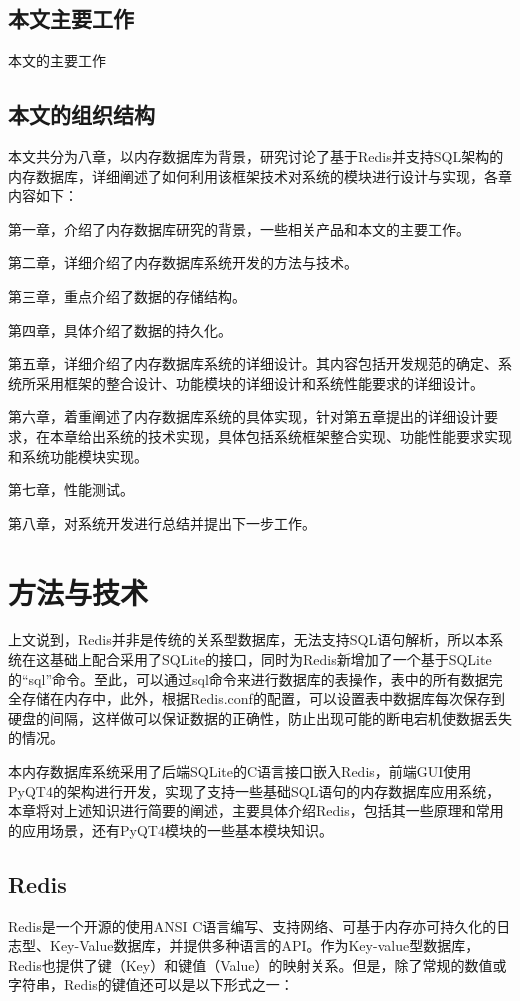 \documentclass{zjutthesis}
\begin{document}
\section{本文主要工作}
本文的主要工作

\section{本文的组织结构}
本文共分为八章，以内存数据库为背景，研究讨论了基于Redis并支持SQL架构的内存数据库，详细阐述了如何利用该框架技术对系统的模块进行设计与实现，各章内容如下：

第一章，介绍了内存数据库研究的背景，一些相关产品和本文的主要工作。

第二章，详细介绍了内存数据库系统开发的方法与技术。

第三章，重点介绍了数据的存储结构。

第四章，具体介绍了数据的持久化。

第五章，详细介绍了内存数据库系统的详细设计。其内容包括开发规范的确定、系统所采用框架的整合设计、功能模块的详细设计和系统性能要求的详细设计。

第六章，着重阐述了内存数据库系统的具体实现，针对第五章提出的详细设计要求，在本章给出系统的技术实现，具体包括系统框架整合实现、功能性能要求实现和系统功能模块实现。

第七章，性能测试。

第八章，对系统开发进行总结并提出下一步工作。


\chapter{方法与技术}
上文说到，Redis并非是传统的关系型数据库，无法支持SQL语句解析，所以本系统在这基础上配合采用了SQLite的接口，同时为Redis新增加了一个基于SQLite的“sql”命令。至此，可以通过sql命令来进行数据库的表操作，表中的所有数据完全存储在内存中，此外，根据Redis.conf的配置，可以设置表中数据库每次保存到硬盘的间隔，这样做可以保证数据的正确性，防止出现可能的断电宕机使数据丢失的情况。

本内存数据库系统采用了后端SQLite的C语言接口嵌入Redis，前端GUI使用PyQT4的架构进行开发，实现了支持一些基础SQL语句的内存数据库应用系统，本章将对上述知识进行简要的阐述，主要具体介绍Redis，包括其一些原理和常用的应用场景，还有PyQT4模块的一些基本模块知识。

\section{Redis}
Redis是一个开源的使用ANSI C语言编写、支持网络、可基于内存亦可持久化的日志型、Key-Value数据库，并提供多种语言的API。作为Key-value型数据库，Redis也提供了键（Key）和键值（Value）的映射关系。但是，除了常规的数值或字符串，Redis的键值还可以是以下形式之一：
\end{document}
